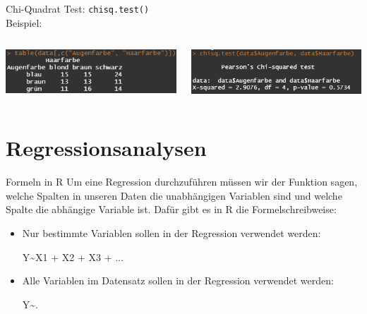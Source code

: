 \documentclass[xcolor=dvipsnames, aspectratio = 169]{beamer}
\begin{document}
\begin{frame}[fragile]{Chi-Quadrat Test:}	
	\verb+chisq.test()+ \\

	Beispiel: \\
	\begin{columns}[T]
		\begin{column}{0.5\textwidth}
			\includegraphics[width=7.5cm]{tabledata}
		\end{column}
		\begin{column}{0.5\textwidth}
			\includegraphics[width=7.5cm]{chisq}
		\end{column}
	\end{columns}
\end{frame}


\section{Regressionsanalysen}

\begin{frame}[fragile]{Formeln in R}
	Um eine Regression durchzuführen müssen wir der Funktion sagen, welche Spalten in unseren Daten die unabhängigen Variablen sind und welche Spalte die abhängige Variable ist. Dafür gibt	es in R die Formelschreibweise:
	\begin{itemize}
		\item Nur bestimmte Variablen sollen in der Regression verwendet werden:
			\begin{center}
				Y\textasciitilde X1 + X2 + X3 + ... 
			\end{center}
		\item Alle Variablen im Datensatz sollen in der Regression verwendet werden:
			\begin{center}
				Y\textasciitilde.
			\end{center}
	\end{itemize}
\end{frame}
\end{document}
